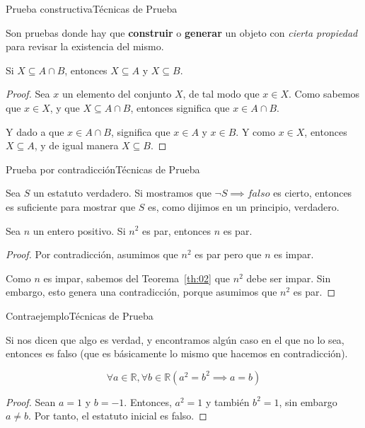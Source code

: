 \documentclass[spanish, c]{beamer}
\begin{document}
\begin{frame}{Prueba constructiva}{Técnicas de Prueba}

    Son pruebas donde hay que \textbf{construir} o \textbf{generar} un objeto con \textit{cierta propiedad} para revisar la existencia del mismo.
    
    \begin{theorem}
        Si $X \subseteq A \cap B$, entonces $X \subseteq A$ y $X \subseteq B$.
    \end{theorem}

    \begin{proof}
        Sea $x$ un elemento del conjunto $X$, de tal modo que $x \in X$.
        Como sabemos que $x \in X$, y que $X \subseteq A \cap B$, entonces significa que $x \in A \cap B$.

        Y dado a que $x \in A \cap B$, significa que $x \in A$ y $x \in B$.
        Y como $x \in X$, entonces $X \subseteq A$, y de igual manera $X \subseteq B$.
    \end{proof}

\end{frame}

\begin{frame}{Prueba por contradicción}{Técnicas de Prueba}

    Sea $S$ un estatuto verdadero. Si mostramos que $\neg S \implies falso$ es cierto, entonces es suficiente para mostrar que $S$ es, como dijimos en un principio, verdadero. \pause

    \begin{theorem}
        Sea $n$ un entero positivo. Si $n^2$ es par, entonces $n$ es par.
    \end{theorem}

    \begin{proof}
        Por contradicción, asumimos que $n^2$ es par pero que $n$ es impar.
        
        Como $n$ es impar, sabemos del Teorema~\ref{th:02} que $n^2$ debe ser impar. Sin embargo, esto genera una contradicción, porque asumimos que $n^2$ es par.
    \end{proof}

\end{frame}

\begin{frame}{Contraejemplo}{Técnicas de Prueba}

    Si nos dicen que algo es verdad, y encontramos algún caso en el que no lo sea, entonces es falso (que es básicamente lo mismo que hacemos en contradicción). \pause

    $$\forall a \in \mathbb{R}, \forall b \in \mathbb{R} (a^2 = b^2 \implies a = b)$$ \pause

    \bigskip

    \begin{proof}
        Sean $a = 1$ y $b = -1$. Entonces, $a^2 = 1$ y también $b^2 = 1$, sin embargo $a \neq b$. Por tanto, el estatuto inicial es falso.
    \end{proof}

\end{frame}
\end{document}
